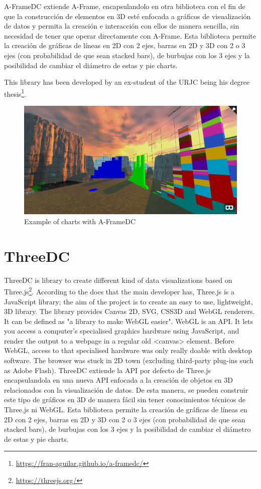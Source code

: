 \documentclass[a4paper, 12pt]{book}
\begin{document}
A-FrameDC extiende A-Frame, encapsulandolo en otra biblioteca con el fin de que la construcción de elementos en 3D esté enfocada a gráficos de visualización de datos y permita la creación e interacción con ellos de manera sencilla, sin necesidad de tener que operar directamente con A-Frame. Esta biblioteca permite la creación de gráficas de líneas en 2D con 2 ejes, barras en 2D y 3D con 2 o 3 ejes (con probabilidad de que sean stacked bars), de burbujas con los 3 ejes y la posibilidad de cambiar el diámetro de estas y pie charts.

This library has been developed by an ex-student of the URJC being his degree thesis\footnote{\url{https://fran-aguilar.github.io/a-framedc/}}.

\begin{figure}[H]
  \centering
  \includegraphics[width=16cm, keepaspectratio]{img/context/aframedc.PNG}
  \caption{Example of charts with A-FrameDC}
  \label{fig:pluginhtml}
\end{figure}



\section{ThreeDC}
\label{sec:threedc}

ThreeDC is library to create different kind of data visualizations based on Three.js\footnote{\url{https://threejs.org/}}. According to the docs that the main developer has, Three.js is a JavaScript library; the aim of the project is to create an easy to use, lightweight, 3D library. The library provides Canvas 2D, SVG, CSS3D and WebGL renderers. It can be defined as "a library to make WebGL easier". 
WebGL is an API. It lets you access a computer’s specialised graphics hardware using JavaScript, and render the output to a webpage in a regular old <canvas> element. Before WebGL, access to that specialised hardware was only really doable with desktop software. The browser was stuck in 2D town (excluding third-party plug-ins such as Adobe Flash).
ThreeDC extiende la API por defecto de Three.js encapsulandola en una nueva API enfocada a la creación de objetos en 3D relacionados con la visualización de datos. De esta manera, se pueden construir este tipo de gráficos en 3D de manera fácil sin tener conocimientos técnicos de Three.js ni WebGL. Esta biblioteca permite la creación de gráficas de líneas en 2D con 2 ejes, barras en 2D y 3D con 2 o 3 ejes (con probabilidad de que sean stacked bars), de burbujas con los 3 ejes y la posibilidad de cambiar el diámetro de estas y pie charts.
\end{document}

